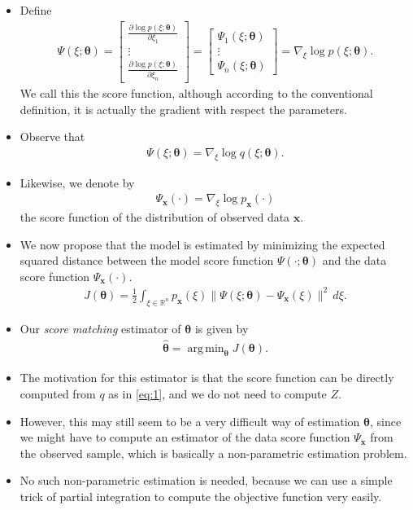 \documentclass[10pt]{article}
\newcommand{\RR}{\mathbb{R}}
\DeclareMathOperator*{\argmin}{arg\,min}
\begin{document}
\begin{itemize}
\item Define
\begin{align*}
\Psi(\xi;\bm{\theta}) =
\begin{bmatrix}
\frac{\partial \log p(\xi;\bm{\theta})}{\partial \xi_1} \\
\vdots \\
\frac{\partial \log p(\xi;\bm{\theta})}{\partial \xi_n}
\end{bmatrix} =
\begin{bmatrix}
\Psi_1(\xi;\bm{\theta}) \\
\vdots \\
\Psi_n(\xi;\bm{\theta})
\end{bmatrix} = \nabla_\xi \log p(\xi;\bm{\theta}).
\end{align*}
We call this the score function, although according to the conventional definition, it is actually the gradient with respect the parameters.
\item Observe that
\begin{align}
\Psi(\xi;\bm{\theta}) = \nabla_\xi \log q(\xi;\bm{\theta}). \label{eq:1}
\end{align}
\item Likewise, we denote by
\begin{align*}
\Psi_\mathbf{x}(\cdot) = \nabla_\xi \log p_\mathbf{x}(\cdot)
\end{align*}
the score function of the distribution of observed data $\mathbf{x}$.
\item We now propose that the model is estimated by minimizing the expected squared distance between the model score function $\Psi(\cdot;\bm{\theta})$ and the data score function $\Psi_\mathbf{x}(\cdot)$.
\begin{align}
J(\bm{\theta}) = \frac{1}{2} \int_{\xi \in \RR^n} p_\mathbf{x}(\xi) \|\Psi(\xi;\bm{\theta}) - \Psi_\mathbf{x}(\xi)\|^2 \, d\xi. \label{eq:2}
\end{align}
\item Our \textit{score matching} estimator of $\bm{\theta}$ is given by
\begin{align*}
\bm{\hat{\theta}} = \argmin_{\bm{\theta}} J(\bm{\theta}).
\end{align*}
\item The motivation for this estimator is that the score function can be directly computed from $q$ as in \eqref{eq:1}, and we do not need to compute $Z$.
\item However, this may still seem to be a very difficult way of estimation $\bm{\theta}$, since we might have to compute an estimator of the data score function $\Psi_\mathbf{x}$ from the observed sample, which is basically a non-parametric estimation problem.
\item No such non-parametric estimation is needed, because we can use a simple trick of partial integration to compute the objective function very easily.
\end{itemize}
\end{document}
